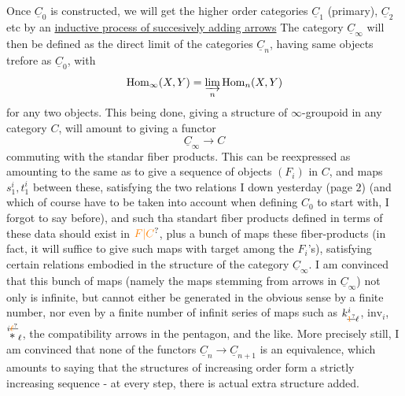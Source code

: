 Once $\underline{C}_0$ is constructed, we will get the higher order categories $\underline{C}_1$ (primary), $\underline{C}_2$ etc by an \uline{inductive process of succesively adding arrows} The category $\underline{C}_\infty$ will then be defined as the direct limit of the categories $\underline{C}_n$, having same objects trefore as $\underline{C}_0$, with
\[
\mathrm{Hom}_\infty(X,Y)=\varinjlim_n\mathrm{Hom}_n(X,Y)
\]
for any two objects. This being done, giving a structure of $\infty$-groupoid in any category $C$, will amount to giving a functor
\[
\underline{C}_\infty\longrightarrow C
\]
commuting with the standar  fiber products. This can be reexpressed\handwritten{,} as amounting to the same as to give a sequence of objects $(F_i)$ in $C$,  and maps $s^i_1,t^i_1$ between these, satisfying the two relations I  down yesterday (page $2$) (and which of course have to be taken into account when defining $C_0$ to start with, I forgot to say before), and such tha standart fiber products defined in terms of these data should exist in $\unsure{F|C}$,%
 plus a bunch of maps  these fiber-products  (in fact, it will suffice to give such maps with target among the $F_i$'s), satisfying certain relations embodied in the structure of the category $\underline{C}_\infty$. I am convinced that this bunch of maps (namely the maps stemming from arrows in $\underline{C}_\infty$) not only is infinite, but cannot either be generated in the
obvious sense by a finite number, nor even by a finite number of infinit series of maps such as $k_{\deleted{\unsure{1}}\handwritten{\ell}}^i$, $\mathrm{inv}_i$, $\overset{i\deleted{\unsure{\ell}}}{*}_\ell$, the compatibility arrows in the pentagon, and the like. More precisely still, I am convinced that none of the functors $\underline{C}_n\to\underline{C}_{n+1}$ is an equivalence, which amounts to saying that the structures of increasing order form a strictly increasing sequence - at every step, there is actual extra structure added.%
